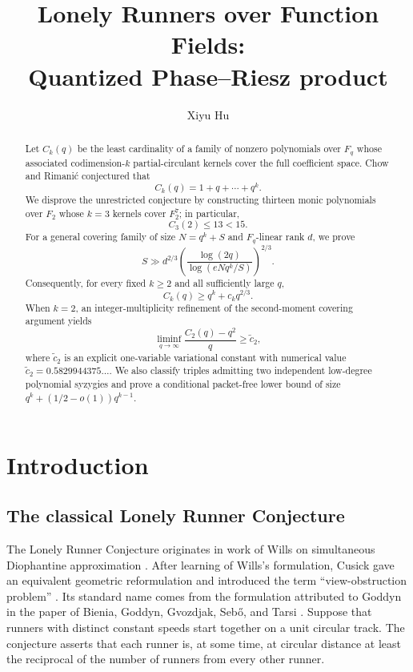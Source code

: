 \documentclass[11pt,reqno]{amsart}
\title[Quantized phase--Riesz product over function fields]
{Lonely Runners over Function Fields:\\ Quantized Phase--Riesz product}
\author{Xiyu Hu}
\date{}
\numberwithin{equation}{section}
\theoremstyle{definition}
\theoremstyle{remark}
\def\mathbb#1{#1}%
\begin{document}
\begin{abstract}
Let $C_k(q)$ be the least cardinality of a family of nonzero polynomials over $\mathbb F_q$ whose associated codimension-$k$ partial-circulant kernels cover the full coefficient space.  Chow and Rimani\'c conjectured that
\[
 C_k(q)=1+q+\cdots+q^k.
\]
We disprove the unrestricted conjecture by constructing thirteen monic polynomials over $\mathbb F_2$ whose $k=3$ kernels cover $\mathbb F_2^7$; in particular,
\[
 C_3(2)\le13<15.
\]
For a general covering family of size $N=q^k+S$ and $\mathbb F_q$-linear rank $d$, we prove
\[
 S\gg d^{2/3}
 \left(
   \frac{\log(2q)}{\log(eNq^k/S)}
 \right)^{2/3}.
\]
Consequently, for every fixed $k\ge2$ and all sufficiently large $q$,
\[
 C_k(q)\ge q^k+c_kq^{2/3}.
\]
When $k=2$, an integer-multiplicity refinement of the second-moment covering argument yields
\[
 \liminf_{q\to\infty}\frac{C_2(q)-q^2}{q}\ge \widetilde c_2,
\]
where $\widetilde c_2$ is an explicit one-variable variational constant with numerical value
$\widetilde c_2=0.5829944375\ldots$.  We also classify triples admitting two independent low-degree polynomial syzygies and prove a conditional packet-free lower bound of size $q^k+(1/2-o(1))q^{k-1}$.
\end{abstract}

\maketitle
\tableofcontents

\section{Introduction}\label{sec:introduction}

\subsection{The classical Lonely Runner Conjecture}

The Lonely Runner Conjecture originates in work of Wills on simultaneous Diophantine approximation
\cite{Wills1967,Wills1968}.  After learning of Wills's formulation, Cusick gave an equivalent geometric reformulation and introduced the term ``view-obstruction problem''
\cite{Cusick}.  Its standard name comes from the formulation attributed to Goddyn in the paper of Bienia, Goddyn, Gvozdjak, Seb\H{o}, and Tarsi
\cite{BieniaEtAl}.  Suppose that runners with distinct constant speeds start together on a unit circular track.  The conjecture asserts that each runner is, at some time, at circular distance at least the reciprocal of the number of runners from every other runner.
\end{document}
